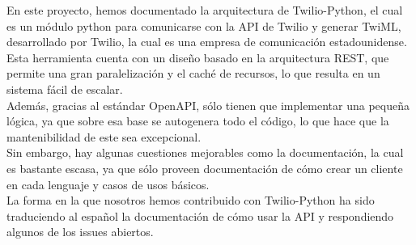 \documentclass{article}
\begin{document}
En este proyecto, hemos documentado la arquitectura de Twilio-Python, el cual es un módulo python para comunicarse con la API de Twilio y generar TwiML, desarrollado por Twilio, la cual es una empresa de comunicación estadounidense.\\
Esta herramienta cuenta con un diseño basado en la arquitectura REST, que permite una gran paralelización y el caché de recursos, lo que resulta en un sistema fácil de escalar.\\
Además, gracias al estándar OpenAPI, sólo tienen que implementar una pequeña lógica, ya que sobre esa base se autogenera todo el código, lo que hace que la mantenibilidad de este sea excepcional.\\
Sin embargo, hay algunas cuestiones mejorables como la documentación, la cual es bastante escasa, ya que sólo proveen documentación de cómo crear un cliente en cada lenguaje y casos de usos básicos. \\
La forma en la que nosotros hemos contribuido con Twilio-Python ha sido traduciendo al español la documentación de cómo usar la API y respondiendo algunos de los issues abiertos.

\newpage

\printbibliography
\end{document}
